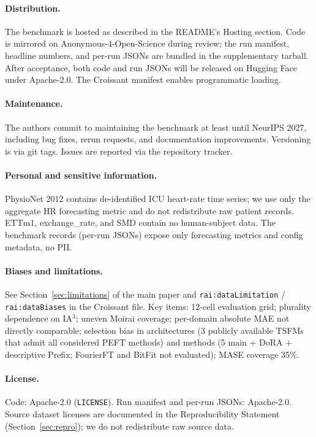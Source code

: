 \paragraph{Distribution.} The benchmark is hosted as described in the README's Hosting section. Code is mirrored on Anonymous-4-Open-Science during review; the run manifest, headline numbers, and per-run JSONs are bundled in the supplementary tarball. After acceptance, both code and run JSONs will be released on Hugging Face under Apache-2.0. The Croissant manifest enables programmatic loading.

\paragraph{Maintenance.} The authors commit to maintaining the benchmark at least until NeurIPS 2027, including bug fixes, rerun requests, and documentation improvements. Versioning is via git tags. Issues are reported via the repository tracker.

\paragraph{Personal and sensitive information.} PhysioNet 2012 contains de-identified ICU heart-rate time series; we use only the aggregate HR forecasting metric and do not redistribute raw patient records. ETTm1, exchange\_rate, and SMD contain no human-subject data. The benchmark records (per-run JSONs) expose only forecasting metrics and config metadata, no PII.

\paragraph{Biases and limitations.} See Section~\ref{sec:limitations} of the main paper and \texttt{rai:dataLimitation} / \texttt{rai:dataBiases} in the Croissant file. Key items: 12-cell evaluation grid; plurality dependence on IA$^3$; uneven Moirai coverage; per-domain absolute MAE not directly comparable; selection bias in architectures (3 publicly available TSFMs that admit all considered PEFT methods) and methods (5 main + DoRA + descriptive Prefix; FourierFT and BitFit not evaluated); MASE coverage 35\%.

\paragraph{License.} Code: Apache-2.0 (\texttt{LICENSE}). Run manifest and per-run JSONs: Apache-2.0. Source dataset licenses are documented in the Reproducibility Statement (Section~\ref{sec:repro}); we do not redistribute raw source data.

